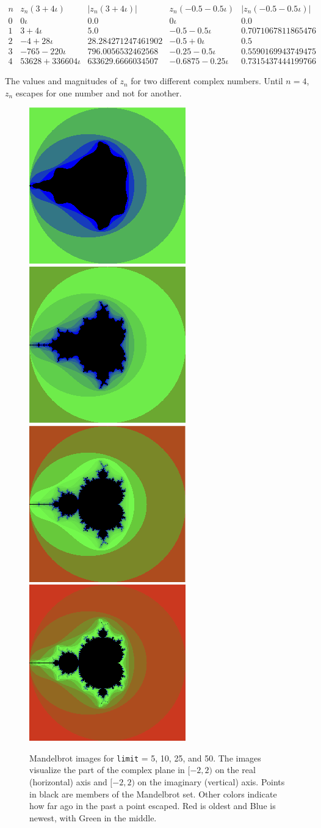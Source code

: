 \documentclass[addpoints]{exam}
\begin{document}
\begin{questions}
\begin{table}
  \centering
  \[\begin{array}{l||c|c||c|c}
      n & z_n(3+4\iota) & |z_n(3+4\iota)| & z_n(-0.5-0.5\iota) & |z_n(-0.5-0.5\iota)|\\\hline
      0 & 0\iota & 0.0 & 0\iota & 0.0\\
      1 & 3+4\iota & 5.0 & -0.5-0.5\iota & 0.7071067811865476\\
      2 & -4+28\iota & 28.284271247461902 & -0.5+0\iota & 0.5\\
      3 & -765-220\iota & 796.0056532462568 & -0.25-0.5\iota & 0.5590169943749475\\
      4 & 53628+336604\iota & 633629.6666034507 & -0.6875-0.25\iota & 0.7315437444199766
    \end{array}
  \]
  \caption{The values and magnitudes of $z_n$ for two different complex numbers. Until $n = 4$, $z_n$ escapes for one number and not for another.}
  \label{tab:mandel}
\end{table}

\begin{figure}
  \centering
  \includegraphics[width=.24\textwidth]{mandel1}
  \includegraphics[width=.24\textwidth]{mandel2}
  \includegraphics[width=.24\textwidth]{mandel3}
  \includegraphics[width=.24\textwidth]{mandel4}
  \caption{Mandelbrot images for {\tt limit} = 5, 10, 25, and 50. The images visualize the part of the complex plane in $[-2,2)$ on the real (horizontal) axis and $[-2,2)$ on the imaginary (vertical) axis. Points in black are members of the Mandelbrot set. Other colors indicate how far ago in the past a point escaped. Red is oldest and Blue is newest, with Green in the middle.}
  \label{fig:mandel}
\end{figure}


\end{questions}
\end{document}

